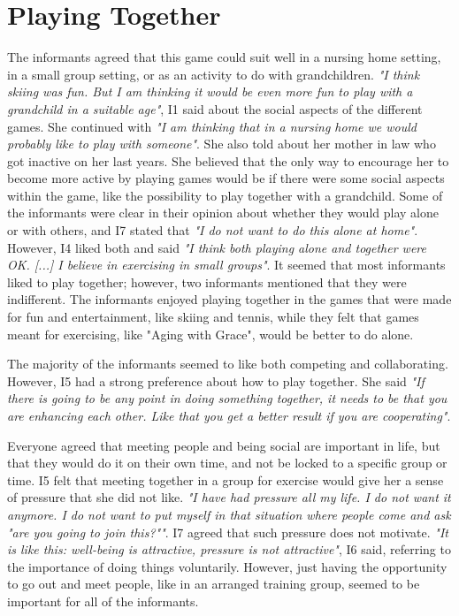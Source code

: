 \section{Playing Together}
The informants agreed that this game could suit well in a nursing home setting, in a small group setting, or as an activity to do with grandchildren. \emph{"I think skiing was fun. But I am thinking it would be even more fun to play with a grandchild in a suitable age"}, I1 said about the social aspects of the different games. She continued with \emph{"I am thinking that in a nursing home we would probably like to play with someone"}. She also told about her mother in law who got inactive on her last years. She believed that the only way to encourage her to become more active by playing games would be if there were some social aspects within the game, like the possibility to play together with a grandchild. Some of the informants were clear in their opinion about whether they would play alone or with others, and I7 stated that \emph{"I do not want to do this alone at home"}. However, I4 liked both and said \emph{"I think both playing alone and together were OK. [...] I believe in exercising in small groups"}. It seemed that most informants liked to play together; however, two informants mentioned that they were indifferent. The informants enjoyed playing together in the games that were made for fun and entertainment, like skiing and tennis, while they felt that games meant for exercising, like "Aging with Grace", would be better to do alone.  

The majority of the informants seemed to like both competing and collaborating. However, I5 had a strong preference about how to play together. She said
\emph{"If there is going to be any point in doing something together, it needs to be that you are enhancing each other. Like that you get a better result if you are cooperating"}.

Everyone agreed that meeting people and being social are important in life, but that they would do it on their own time, and not be locked to a specific group or time. I5 felt that meeting together in a group for exercise would give her a sense of pressure that she did not like. \emph{"I have had pressure all my life. I do not want it anymore. I do not want to put myself in that situation where people come and ask "are you going to join this?""}. I7 agreed that such pressure does not motivate. \emph{"It is like this: well-being is attractive, pressure is not attractive"}, I6 said, referring to the importance of doing things voluntarily. However, just having the opportunity to go out and meet people, like in an arranged training group, seemed to be important for all of the informants. 

